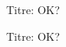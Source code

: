 \documentclass[12pt]{article}
\newcommand\test{Titre: OK?}
\begin{document}
\test{}

Titre: OK?
\end{document}
